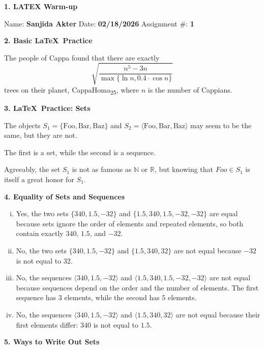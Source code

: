 \documentclass[12pt]{article}
\begin{document}
\textbf{1. LATEX Warm-up}

Name: \textbf{Sanjida Akter}
Date: \textbf{02/18/2026} 
Assignment \#: \textbf{1}

\hrulefill

\textbf{2. Basic \LaTeX\ Practice}

The people of Cappa found that there are exactly
\[
\sqrt{\frac{n^5 - 3n}{\max\{\ln n, 0.4 \cdot \cos n\}}}
\]
trees on their planet, CappaHoma\textsubscript{25}, where $n$ is the number of Cappians.

\textbf{3. \LaTeX\ Practice: Sets}

The objects $S_1 = \{\text{Foo}, \text{Bar}, \text{Baz}\}$ and 
$S_2 = \langle \text{Foo}, \text{Bar}, \text{Baz} \rangle$ may seem to be the same, but they are not.

The first is a set, while the second is a sequence.

Agreeably, the set $S_1$ is not as famous as $\mathbb{N}$ or $\mathbb{R}$, but knowing that $Foo \in S_1$ is itself a great honor for $S_1$.

\textbf{4. Equality of Sets and Sequences}

\begin{enumerate}[i.]

\item 
Yes, the two sets $\{340,1.5,-32\}$ and $\{1.5,340,1.5,-32,-32\}$ are equal because sets ignore the order of elements and repeated elements, so both contain exactly $340$, $1.5$, and $-32$.

\item 
No, the two sets $\{340,1.5,-32\}$ and $\{1.5,340,32\}$ are not equal because $-32$ is not equal to $32$.

\item 
No, the sequences $\langle340,1.5,-32\rangle$ and $\langle1.5,340,1.5,-32,-32\rangle$ are not equal because sequences depend on the order and the number of elements. The first sequence has $3$ elements, while the second has $5$ elements.

\item 
No, the sequences $\langle340,1.5,-32\rangle$ and $\langle1.5,340,32\rangle$ are not equal because their first elements differ: $340$ is not equal to $1.5$.

\end{enumerate}

\textbf{5. Ways to Write Out Sets}
\end{document}
